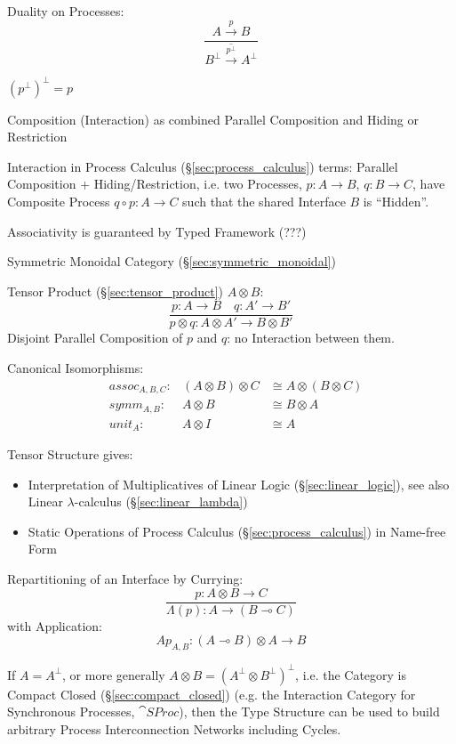 Duality on Processes:
\[
  \frac{A \xrightarrow{p} B}
  {\overline{B^\bot \xrightarrow{p^\bot} A^\bot}}
\]

$(p^\bot)^\bot = p$

Composition (Interaction) as combined Parallel Composition and Hiding
or Restriction

Interaction in Process Calculus (\S\ref{sec:process_calculus}) terms:
Parallel Composition + Hiding/Restriction, i.e. two Processes, $p : A
\rightarrow B$, $q : B \rightarrow C$, have Composite Process $q \circ
p : A \rightarrow C$ such that the shared Interface $B$ is ``Hidden''.

Associativity is guaranteed by Typed Framework (???)

Symmetric Monoidal Category (\S\ref{sec:symmetric_monoidal})

Tensor Product (\S\ref{sec:tensor_product}) $A \otimes B$:
\[
  \frac{p : A \rightarrow B \quad q : A' \rightarrow B'}
  {p \otimes q : A \otimes A' \rightarrow B \otimes B'}
\]
Disjoint Parallel Composition of $p$ and $q$: no Interaction between
them.

Canonical Isomorphisms:
\begin{align*}
  & assoc_{A,B,C} : & (A \otimes B) \otimes C & \cong
    A \otimes (B \otimes C) \\
  & symm_{A,B} : & A \otimes B & \cong B \otimes A \\
  & unit_A : & A \otimes I & \cong A
\end{align*}

Tensor Structure gives:
\begin{itemize}
  \item Interpretation of Multiplicatives of Linear Logic
    (\S\ref{sec:linear_logic}), see also Linear $\lambda$-calculus
    (\S\ref{sec:linear_lambda})
  \item Static Operations of Process Calculus
    (\S\ref{sec:process_calculus}) in Name-free Form
\end{itemize}

Repartitioning of an Interface by Currying:
\[
  \frac{p:A \otimes B \rightarrow C}
  {\Lambda (p) : A \rightarrow (B \multimap C)}
\]
with Application:
\[
  Ap_{A,B} : (A \multimap B) \otimes A \rightarrow B
\]

If $A = A^\bot$, or more generally $A \otimes B = (A^\bot \otimes
B^\bot)^\bot$, i.e. the Category is Compact Closed
(\S\ref{sec:compact_closed}) (e.g. the Interaction Category for
Synchronous Processes, $\cat{SProc}$), then the Type Structure can be
used to build arbitrary Process Interconnection Networks including
Cycles.


